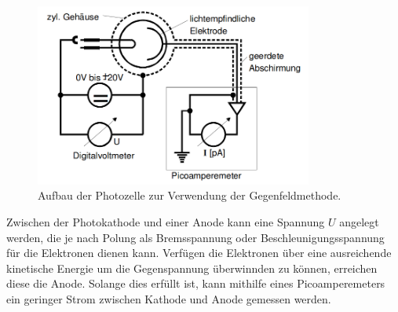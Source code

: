 \begin{figure}
  \centering
  \includegraphics[height=6cm]{ressources/aufbau_3.png}
  \caption{Aufbau der Photozelle zur Verwendung der Gegenfeldmethode. \cite{skript}}
  \label{abb:3}
\end{figure}

Zwischen der Photokathode und einer Anode kann eine Spannung $U$ angelegt werden, die je nach Polung als Bremsspannung oder Beschleunigungsspannung für die Elektronen dienen kann.
Verfügen die Elektronen über eine ausreichende kinetische Energie um die Gegenspannung überwinnden zu können, erreichen diese die Anode.
Solange dies erfüllt ist, kann mithilfe eines Picoamperemeters ein geringer Strom zwischen Kathode und Anode gemessen werden.
